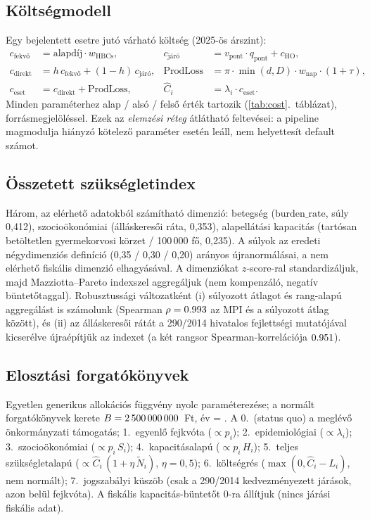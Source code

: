 \documentclass[11pt,a4paper]{article}
\begin{document}
\subsection{Költségmodell}
Egy bejelentett esetre jutó várható költség (2025-ös árszint):
\begin{align}
c_{\text{fekvő}} &= \text{alapdíj}\cdot w_{\text{HBCs}}, &
c_{\text{járó}} &= v_{\text{pont}}\cdot q_{\text{pont}} + c_{\text{HO}},\\
c_{\text{direkt}} &= h\, c_{\text{fekvő}} + (1-h)\, c_{\text{járó}}, &
\text{ProdLoss} &= \pi\cdot \min(d, D)\cdot w_{\text{nap}}\cdot(1+\tau),\\
c_{\text{eset}} &= c_{\text{direkt}} + \text{ProdLoss}, &
\widehat C_i &= \lambda_i\cdot c_{\text{eset}}.
\end{align}
Minden paraméterhez alap / alsó / felső érték tartozik
(\ref{tab:cost}.~táblázat), forrásmegjelöléssel. Ezek az \emph{elemzési
réteg} átlátható feltevései: a pipeline magmodulja hiányzó kötelező paraméter
esetén leáll, nem helyettesít default számot.



\subsection{Összetett szükségletindex}
Három, az elérhető adatokból számítható dimenzió: betegség
($\mathrm{burden\_rate}$, súly 0{,}412), szocioökonómiai (álláskeresői ráta,
0{,}353), alapellátási kapacitás (tartósan betöltetlen gyermekorvosi körzet /
100\,000 fő, 0{,}235). A súlyok az eredeti négydimenziós definíció (0{,}35 /
0{,}30 / 0{,}20) arányos újranormálásai, a nem elérhető fiskális dimenzió
elhagyásával. A dimenziókat $z$-score-ral standardizáljuk, majd
Mazziotta--Pareto indexszel aggregáljuk (nem kompenzáló, negatív
büntetőtaggal). Robusztussági változatként (i) súlyozott átlagot és
rang-alapú aggregálást is számolunk (Spearman
$\rho=0.993$ az MPI és a súlyozott átlag között), és
(ii) az álláskeresői rátát a 290/2014 hivatalos fejlettségi mutatójával
kicserélve újraépítjük az indexet (a két rangsor Spearman-korrelációja
$0.951$).

\subsection{Elosztási forgatókönyvek}
Egyetlen generikus allokációs függvény nyolc paraméterezése; a normált
forgatókönyvek kerete $B = 2\,500\,000\,000$~Ft, év = \csYear. A 0.~(status quo) a
meglévő önkormányzati támogatás; 1.~egyenlő fejkvóta ($\propto p_i$);
2.~epidemiológiai ($\propto \lambda_i$); 3.~szocioökonómiai
($\propto p_i\, S_i$); 4.~kapacitásalapú ($\propto p_i\, H_i$); 5.~teljes
szükségletalapú ($\propto \widehat C_i\,(1+\eta\,\tilde N_i)$, $\eta=0{,}5$);
6.~költségrés ($\max(0,\widehat C_i - L_i)$, nem normált); 7.~jogszabályi
küszöb (csak a 290/2014 kedvezményezett járások, azon belül fejkvóta). A
fiskális kapacitás-büntetőt 0-ra állítjuk (nincs járási fiskális adat).
\end{document}
